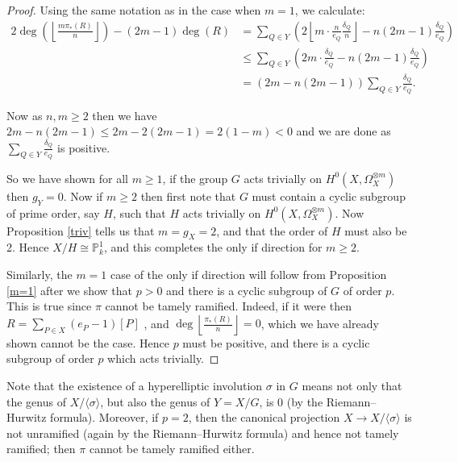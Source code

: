 \begin{proof}
    Using the same notation as in the case when $m=1$, we calculate:
        \begin{align*}
        2\deg\left(\left\lfloor\frac{m\pi_*(R)}{n}\right\rfloor\right)-(2m-1)\deg(R) & = \sum_{Q \in Y} \left(2\left\lfloor m\cdot \frac{n}{e_Q}\frac{\delta_Q}{n}\right\rfloor -n(2m-1)\frac{\delta_Q}{e_Q}\right) \\
        & \leq   \sum_{Q\in Y}\left( 2m\cdot\frac{\delta_Q}{e_Q}-n(2m-1)\frac{\delta_Q}{e_Q}\right) \\
        & =  (2m-n(2m-1))\sum_{Q\in Y }\frac{\delta_Q}{e_Q}.
        \end{align*}
    
    Now as $n,m\geq 2$ then we have $2m-n(2m-1)\leq 2m-2(2m-1)=2(1-m)<0$ and we are done as $\sum_{Q\in Y}\frac{\delta_Q}{e_Q}$ is positive.
    
    So we have shown for all $m\geq 1$, if the group $G$ acts trivially  on $H^0(X,\Omega_X^{\otimes m})$ then $g_Y=0$.
    Now if $m\geq 2$ then first note that $G$ must contain a cyclic subgroup of prime order, say $H$, such that $H$ acts trivially on $H^0(X,\Omega_X^{\otimes m})$.
    Now Proposition \ref{triv} tells us that $m=g_X=2$, and that the order of $H$ must also be 2.
    Hence $X/H\cong \mathbb{P}_k^1$, and this completes the only if direction for $m\geq 2$.
    
    Similarly, the $m=1$ case of the only if direction will follow from Proposition \ref{m=1} after we show that $p>0$ and there is a cyclic subgroup of $G$ of order $p$. 
    This is true since $\pi$ cannot be tamely ramified.
    Indeed, if it were then $R=\sum_{P\in X} (e_P-1)[P]$ \cite[Chap.\ IV, Cor.\ 2.4]{hart}, and $\deg\left\lfloor \frac{\pi_*(R)}{n} \right\rfloor=0$, which we have already shown cannot be the case.
    Hence $p$ must be positive, and there is a cyclic subgroup of order $p$ which acts trivially.
    \end{proof}

    \begin{rem}
    Note that the existence of a hyperelliptic involution $\sigma$ in $G$ means not only that the genus of $X/\langle \sigma \rangle$, but also the genus of $Y=X/G$, is $0$ (by the Riemann--Hurwitz formula).
    Moreover, if $p=2$, then the canonical projection $X\rightarrow X/\langle \sigma \rangle$ is not unramified (again by the Riemann--Hurwitz formula) and hence not tamely ramified; then $\pi$ cannot be tamely ramified either.
    \end{rem}


